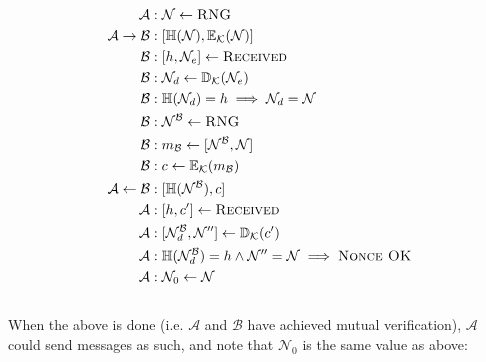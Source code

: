 \documentclass{article}
\begin{document}
\begin{align*}
    \mathcal A &: \mathcal N \leftarrow \textsc{RNG} 
    \\
    \mathcal A \rightarrow \mathcal B &: [\mathbb H(\mathcal N), \mathbb E_{\mathcal K} (\mathcal N)] 
    \\
    \mathcal B &: [h, \mathcal N_e] \leftarrow \textsc{Received} 
    \\
    \mathcal B &: \mathcal N_d \leftarrow \mathbb D_{\mathcal K}(\mathcal N _e) 
    \\
    \mathcal B &: \mathbb H(\mathcal N_d) = h \implies \mathcal N_d = \mathcal N
    \\
    \mathcal B &: \mathcal N^{\mathcal B} \leftarrow \textsc{RNG}
    \\
    \mathcal B &: m_\mathcal{B} \leftarrow [\mathcal N^{\mathcal B}, \mathcal N]
    \\
    \mathcal B &: c \leftarrow \mathbb E_{\mathcal K}(m_\mathcal{B})
    \\
    \mathcal A \leftarrow \mathcal B &: [\mathbb H(\mathcal N^{\mathcal B}), c]
    \\
    \mathcal A &: [h, c'] \leftarrow \textsc{Received}
    \\
    \mathcal A &: [\mathcal N^{\mathcal B}_d, \mathcal N''] \leftarrow \mathbb D _{\mathcal K} (c')
    \\
    \mathcal A &: \mathbb H(\mathcal N^{\mathcal B}_d) = h \land \mathcal N '' = \mathcal N \implies \textsc{Nonce OK}
    \\
    \mathcal A &: \mathcal N_0 \leftarrow \mathcal N
\end{align*}
\\
When the above is done (i.e. $\mathcal A$ and $\mathcal B$ have achieved mutual verification), $\mathcal A$ could send messages as such, and note that $\mathcal N_0$ is the same value as above:
\end{document}
